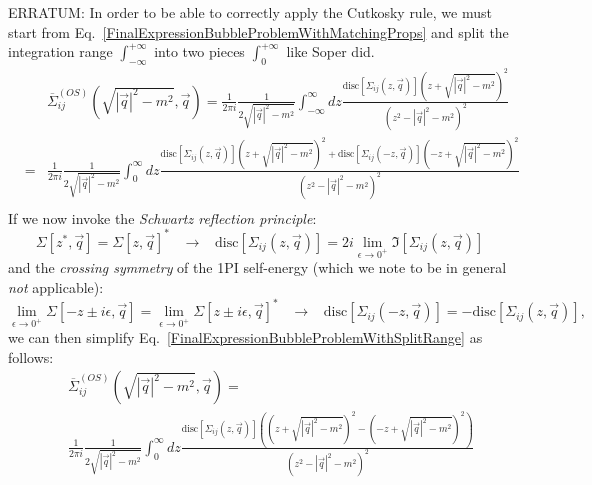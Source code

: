 \documentclass[11pt]{article}
\begin{document}
\vspace{4cm}
\noindent ERRATUM: In order to be able to correctly apply the Cutkosky rule, we must start from Eq.~\ref{FinalExpressionBubbleProblemWithMatchingProps} and split the integration range $\int_{-\infty}^{+\infty}$ into two pieces $\int_{0}^{+\infty}$ like Soper did.
\begin{eqnarray}
\label{MasterBubbleFormula}
&&\overline{\Sigma}_{ij}^{(OS)}(\sqrt{|\vec{q}|^2-m^2 }, \vec{q}) = 
\frac{ 1 }{2\pi i} \frac{1}{2\sqrt{|\vec{q}|^2-m^2 }} \int_{-\infty}^\infty d z \frac{ 
\textrm{disc} \left[ \Sigma_{ij}(z, \vec{q}) \right] \left( z + \sqrt{|\vec{q}|^2-m^2 }\right)^2
}{( z^2 - |\vec{q}|^2-m^2)^2 } \nonumber\\
&=& 
\frac{ 1 }{2\pi i} \frac{1}{2\sqrt{|\vec{q}|^2-m^2 }} \int_{0}^\infty d z \frac{ 
\textrm{disc} \left[ \Sigma_{ij}(z, \vec{q}) \right] \left( z + \sqrt{|\vec{q}|^2-m^2 }\right)^2
+ \textrm{disc} \left[ \Sigma_{ij}(-z, \vec{q}) \right] \left( -z + \sqrt{|\vec{q}|^2-m^2 }\right)^2
}{( z^2 - |\vec{q}|^2-m^2)^2 }\nonumber \\
\label{FinalExpressionBubbleProblemWithSplitRange}
\end{eqnarray}
If we now invoke the \emph{Schwartz reflection principle}:
\begin{equation}
\Sigma[z^*,\vec{q}]=\Sigma[z,\vec{q}]^* 
\;\;\;\rightarrow\;\;\; 
\textrm{disc} \left[ \Sigma_{ij}(z, \vec{q}) \right]=2i \lim_{\epsilon\rightarrow 0^+}\Im[\Sigma_{ij}(z, \vec{q})]
\end{equation}
and the \emph{crossing symmetry} of the 1PI self-energy (which we note to be in general \emph{not} applicable):
\begin{equation}
\lim_{\epsilon\rightarrow 0^+} \Sigma[-z\pm i \epsilon,\vec{q}]=\lim_{\epsilon\rightarrow 0^+} \Sigma[z\pm i\epsilon,\vec{q}]^*
\;\;\;\rightarrow\;\;\; 
\textrm{disc} \left[ \Sigma_{ij}(-z, \vec{q}) \right] = -\textrm{disc} \left[ \Sigma_{ij}(z, \vec{q}) \right],
\end{equation}
we can then simplify Eq.~\ref{FinalExpressionBubbleProblemWithSplitRange} as follows:
\begin{eqnarray}
&&\overline{\Sigma}_{ij}^{(OS)}(\sqrt{|\vec{q}|^2-m^2 }, \vec{q})= \nonumber\\ 
&&\frac{ 1 }{2\pi i} \frac{1}{2\sqrt{|\vec{q}|^2-m^2 }} \int_{0}^\infty d z \frac{ 
\textrm{disc} \left[ \Sigma_{ij}(z, \vec{q}) \right] 
\left( 
\left( z + \sqrt{|\vec{q}|^2-m^2 }\right)^2
- \left( -z + \sqrt{|\vec{q}|^2-m^2 }\right)^2
\right)
}{( z^2 - |\vec{q}|^2-m^2)^2 } \nonumber \\
\end{eqnarray} 
\end{document}
